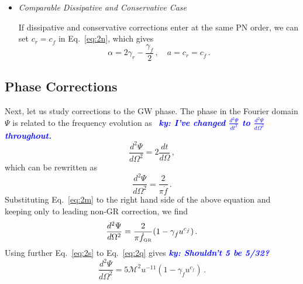 \documentclass[prd,twocolumn,nofootinbib]{revtex4-1}
\newcommand{\GR}{{\mbox{\tiny GR}}}
\newcommand{\ky}[1]{\textcolor{blue}{\it{\textbf{ky: #1}}} }
\begin{document}
\begin{itemize}

\item
\emph{Comparable Dissipative and Conservative Case}

If dissipative and conservative corrections enter at the same PN order, we can set $c_r=c_{\dot{f}}$ in Eq.~\eqref{eq:2n}, which gives 
\begin{equation}
\label{eq:amp-PPE-comparable}
\alpha=2 \text{$\gamma_r $}-\frac{\text{$\gamma_{\dot{f}} $}}{2}\,, \quad a=c_{r}=c_{\dot{f}}\,.
\end{equation}

\end{itemize}

\subsection{Phase Corrections}

Next, let us study corrections to the GW phase. The phase in the Fourier domain $\Psi$ is related to the frequency evolution as~\cite{Tichy:1999pv} \ky{I've changed $\frac{d^2\Psi}{d t^2}$ to $\frac{d^2\Psi}{d \Omega^2}$ throughout.}
\begin{equation}
\frac{d^2\Psi}{d \Omega^2}=2\frac{d t}{d\Omega}\,,
\end{equation}
which can be rewritten as
\begin{equation}
\frac{d^2\Psi}{d \Omega^2}=\frac{2}{\pi \dot{f}}\,.
\end{equation}
Substituting Eq.~\eqref{eq:2m} to the right hand side of the above equation and keeping only to leading non-GR correction, we find 
\begin{equation}\label{eq:2q}
\frac{d^2\Psi}{d \Omega^2}=\frac{2}{\pi\dot{f}_{\GR}}(1-\gamma_{\dot{f}}u^{c_{\dot{f}}})\,.
\end{equation}
Using further Eq.~\eqref{eq:2s} to Eq.~\eqref{eq:2q} gives \ky{Shouldn't 5 be 5/32?}
\begin{equation}\label{eq:2r}
\frac{d^2\Psi}{d \Omega^2}=5\mathcal{M}^2u^{-11}(1-\gamma_{\dot{f}}u^{c_{\dot{f}}})\,.
\end{equation}
\end{document}
